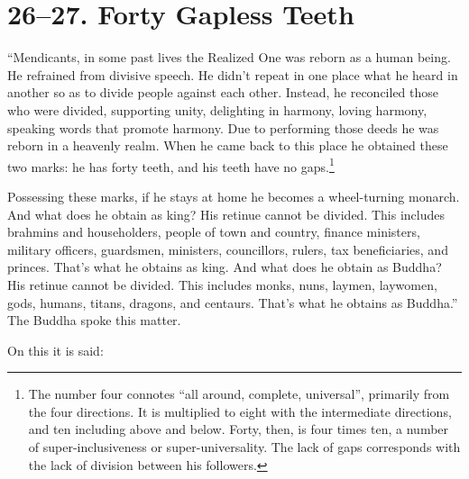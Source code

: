 \documentclass[12pt,openany]{book}%
\begin{document}
\section*{26–27. Forty Gapless Teeth }

“Mendicants, in some past lives the Realized One was reborn as a human being. He refrained from divisive speech. He didn’t repeat in one place what he heard in another so as to divide people against each other. Instead, he reconciled those who were divided, supporting unity, delighting in harmony, loving harmony, speaking words that promote harmony. Due to performing those deeds he was reborn in a heavenly realm. When he came back to this place he obtained these two marks: he has forty teeth, and his teeth have no gaps.\footnote{The number four connotes “all around, complete, universal”, primarily from the four directions. It is multiplied to eight with the intermediate directions, and ten including above and below. Forty, then, is four times ten, a number of super-inclusiveness or super-universality. The lack of gaps corresponds with the lack of division between his followers. } 

Possessing these marks, if he stays at home he becomes a wheel-turning monarch. And what does he obtain as king? His retinue cannot be divided. This includes brahmins and householders, people of town and country, finance ministers, military officers, guardsmen, ministers, councillors, rulers, tax beneficiaries, and princes. That’s what he obtains as king. And what does he obtain as Buddha? His retinue cannot be divided. This includes monks, nuns, laymen, laywomen, gods, humans, titans, dragons, and centaurs. That’s what he obtains as Buddha.” The Buddha spoke this matter. 

On this it is said: 
\end{document}
